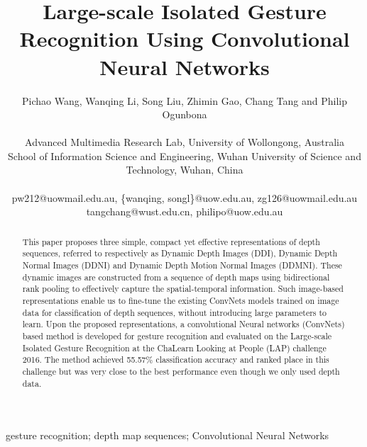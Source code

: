 \documentclass[10pt, a4paper, conference]{IEEEtran}
\begin{document}
\title{Large-scale Isolated Gesture Recognition Using Convolutional Neural Networks}


\author{Pichao Wang, Wanqing Li, Song Liu, Zhimin Gao, Chang Tang and Philip Ogunbona\\
\\
Advanced Multimedia Research Lab, University of Wollongong, Australia\\
School of Information Science and Engineering, Wuhan University of Science and Technology, Wuhan, China\\
\\
{ pw212@uowmail.edu.au, \{wanqing, songl\}@uow.edu.au, zg126@uowmail.edu.au}\\
{ tangchang@wust.edu.cn, philipo@uow.edu.au}
}






\maketitle


\begin{abstract}
This paper proposes three simple, compact yet effective representations of depth sequences, referred to respectively as Dynamic Depth Images (DDI), Dynamic Depth Normal Images (DDNI) and Dynamic Depth Motion Normal Images (DDMNI). These dynamic images are constructed from a sequence of depth maps using bidirectional rank pooling to effectively capture the spatial-temporal information. Such image-based representations enable us to fine-tune the existing ConvNets models trained on image data for classification of depth sequences, without introducing large parameters to learn. Upon the proposed representations, a convolutional Neural networks (ConvNets) based method is developed for gesture recognition and evaluated on the Large-scale Isolated Gesture Recognition at the ChaLearn Looking at People (LAP) challenge 2016. The method achieved 55.57\% classification accuracy and ranked  place in this challenge but was very close to the best performance even though we only used depth data.

\end{abstract}

\begin{IEEEkeywords}
gesture recognition; depth map sequences; Convolutional Neural Networks

\end{IEEEkeywords}


\IEEEpeerreviewmaketitle
\end{document}
